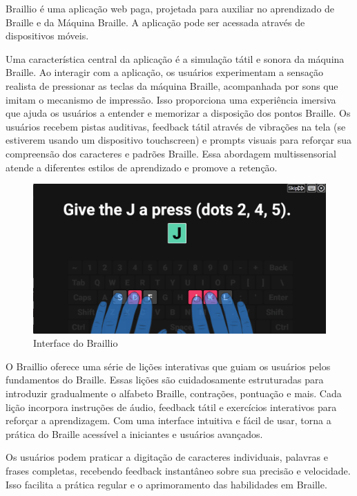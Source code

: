 Braillio é uma aplicação web paga, projetada para auxiliar no aprendizado de Braille e da Máquina Braille. A aplicação pode ser acessada através de dispositivos móveis.

Uma característica central da aplicação é a simulação tátil e sonora da máquina Braille. Ao interagir com a aplicação, os usuários experimentam a sensação realista de pressionar as teclas da máquina Braille, acompanhada por sons que imitam o mecanismo de impressão. Isso proporciona uma experiência imersiva que ajuda os usuários a entender e memorizar a disposição dos pontos Braille. Os usuários recebem pistas auditivas, feedback tátil através de vibrações na tela (se estiverem usando um dispositivo touchscreen) e prompts visuais para reforçar sua compreensão dos caracteres e padrões Braille. Essa abordagem multissensorial atende a diferentes estilos de aprendizado e promove a retenção.

\begin{figure}[h]
    \centering
    \includegraphics[scale=0.3]{ch02/assets/braillio-gui.png}
    \decoRule
    \caption[Interface do Braillio]{Interface do Braillio}
    \label{fig:ch02-braillio-gui}
\end{figure}

O Braillio oferece uma série de lições interativas que guiam os usuários pelos fundamentos do Braille. Essas lições são cuidadosamente estruturadas para introduzir gradualmente o alfabeto Braille, contrações, pontuação e mais. Cada lição incorpora instruções de áudio, feedback tátil e exercícios interativos para reforçar a aprendizagem. Com uma interface intuitiva e fácil de usar, torna a prática do Braille acessível a iniciantes e usuários avançados. 

Os usuários podem praticar a digitação de caracteres individuais, palavras e frases completas, recebendo feedback instantâneo sobre sua precisão e velocidade. Isso facilita a prática regular e o aprimoramento das habilidades em Braille.


